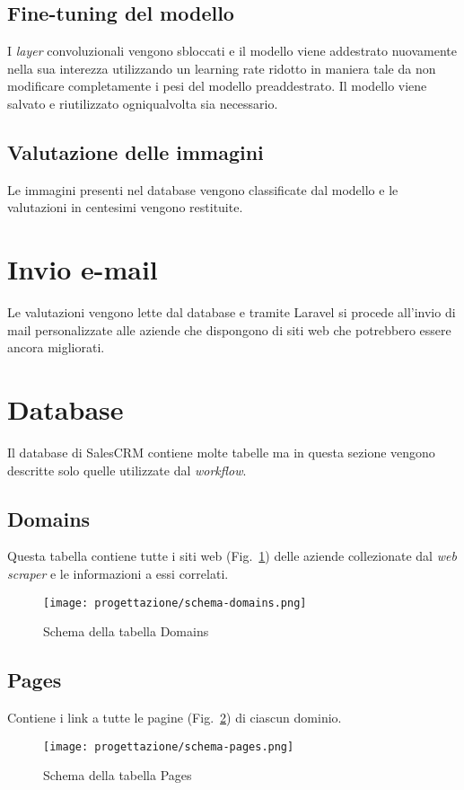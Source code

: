 \subsection{Fine-tuning del modello}
I \emph{layer} convoluzionali vengono sbloccati e il modello viene addestrato nuovamente nella sua interezza utilizzando un learning rate ridotto in maniera tale da non modificare completamente i pesi del modello preaddestrato.
Il modello viene salvato e riutilizzato ogniqualvolta sia necessario.

\subsection{Valutazione delle immagini}
Le immagini presenti nel database vengono classificate dal modello e le valutazioni in centesimi vengono restituite.

\section{Invio e-mail}
Le valutazioni vengono lette dal database e tramite Laravel si procede all'invio di mail personalizzate alle aziende che dispongono di siti web che potrebbero essere ancora migliorati.

\section{Database}
Il database di SalesCRM contiene molte tabelle ma in questa sezione vengono descritte solo quelle utilizzate dal \emph{workflow}.

\subsection{Domains}
Questa tabella contiene tutte i siti web (Fig.~\ref{fig:schema-domains}) delle aziende collezionate dal \emph{web scraper} e le informazioni a essi correlati.


\begin{figure}[!h] 
  \centering 
  \texttt{[image: progettazione/schema-domains.png]} 
  \caption{Schema della tabella Domains}
  \label{fig:schema-domains}
\end{figure}

\newpage 

\subsection{Pages}
Contiene i link a tutte le pagine (Fig.~\ref{fig:schema-pages}) di ciascun dominio.

\begin{figure}[!h] 
  \centering 
  \texttt{[image: progettazione/schema-pages.png]} 
  \caption{Schema della tabella Pages}
  \label{fig:schema-pages}
\end{figure}
